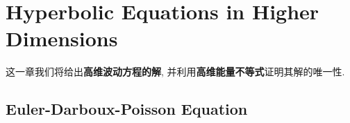 \ifx\allfiles\undefined


	\else
	\fi
\chapter{Hyperbolic Equations in Higher Dimensions}

	\begin{center}
		这一章我们将给出\textbf{高维波动方程的解}, 并利用\textbf{高维能量不等式}证明其解的唯一性. 
	\end{center}
	
\section{Euler-Darboux-Poisson Equation}
	
	\vspace*{2em}
	
